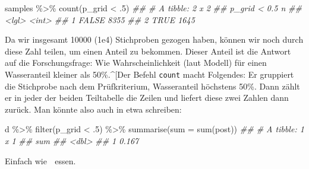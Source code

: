 \documentclass[
  a4paper,
  DIV=11]{scrreprt}
\newenvironment{Shaded}{\begin{snugshade}}{\end{snugshade}}
\newcommand{\AttributeTok}[1]{\textcolor[rgb]{0.40,0.45,0.13}{#1}}
\newcommand{\DecValTok}[1]{\textcolor[rgb]{0.68,0.00,0.00}{#1}}
\newcommand{\DocumentationTok}[1]{\textcolor[rgb]{0.37,0.37,0.37}{\textit{#1}}}
\newcommand{\FunctionTok}[1]{\textcolor[rgb]{0.28,0.35,0.67}{#1}}
\newcommand{\NormalTok}[1]{\textcolor[rgb]{0.00,0.23,0.31}{#1}}
\newcommand{\SpecialCharTok}[1]{\textcolor[rgb]{0.37,0.37,0.37}{#1}}
\theoremstyle{definition}
\theoremstyle{remark}
\begin{document}
\begin{Shaded}
\begin{Highlighting}[]
\NormalTok{samples }\SpecialCharTok{\%\textgreater{}\%}
  \FunctionTok{count}\NormalTok{(p\_grid }\SpecialCharTok{\textless{}}\NormalTok{ .}\DecValTok{5}\NormalTok{) }
\DocumentationTok{\#\# \# A tibble: 2 x 2}
\DocumentationTok{\#\#   \textasciigrave{}p\_grid \textless{} 0.5\textasciigrave{}     n}
\DocumentationTok{\#\#   \textless{}lgl\textgreater{}          \textless{}int\textgreater{}}
\DocumentationTok{\#\# 1 FALSE           8355}
\DocumentationTok{\#\# 2 TRUE            1645}
\end{Highlighting}
\end{Shaded}

Da wir insgesamt 10000 (1e4) Stichproben gezogen haben, können wir noch
durch diese Zahl teilen, um einen Anteil zu bekommen. Dieser Anteil ist
die Antwort auf die Forschungsfrage: Wie Wahrscheinlichkeit (laut
Modell) für einen Wasseranteil kleiner als 50\%.\^{}{[}Der Befehl
\texttt{count} macht Folgendes: Er gruppiert die Stichprobe nach dem
Prüfkriterium, Wasseranteil höchstens 50\%. Dann zählt er in jeder der
beiden Teiltabelle die Zeilen und liefert diese zwei Zahlen dann zurück.
Man könnte also auch in etwa schreiben:

\begin{Shaded}
\begin{Highlighting}[]
\NormalTok{d }\SpecialCharTok{\%\textgreater{}\%}
  \FunctionTok{filter}\NormalTok{(p\_grid }\SpecialCharTok{\textless{}}\NormalTok{ .}\DecValTok{5}\NormalTok{) }\SpecialCharTok{\%\textgreater{}\%}
  \FunctionTok{summarise}\NormalTok{(}\AttributeTok{sum =} \FunctionTok{sum}\NormalTok{(post))}
\DocumentationTok{\#\# \# A tibble: 1 x 1}
\DocumentationTok{\#\#     sum}
\DocumentationTok{\#\#   \textless{}dbl\textgreater{}}
\DocumentationTok{\#\# 1 0.167}
\end{Highlighting}
\end{Shaded}

Einfach wie 🍰 essen.
\end{document}
